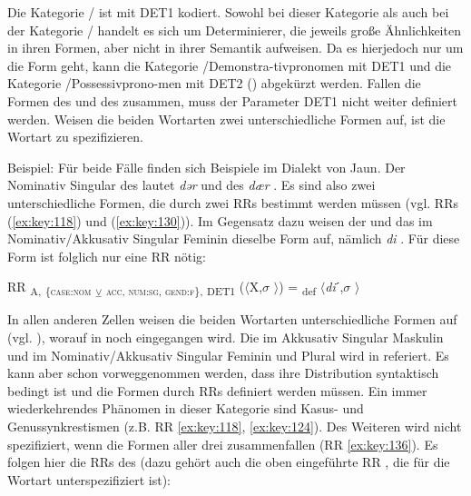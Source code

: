 Die Kategorie / ist mit DET1 kodiert. Sowohl bei dieser Kategorie als auch bei der Kategorie / handelt es sich um Determinierer, die jeweils große Ähnlichkeiten in ihren Formen, aber nicht in ihrer Semantik aufweisen. Da es hier\linebreak jedoch nur um die Form geht, kann die Kategorie \slash{}Demonstra-\linebreak tivpronomen mit DET1 und die Kategorie \slash Possessivprono-\linebreak men mit DET2 () abgekürzt werden. Fallen die Formen des  und des  zusammen, muss der Parameter DET1 nicht weiter definiert werden. Weisen die beiden Wortarten zwei unterschiedliche Formen auf, ist die Wortart zu spezifizieren.

{Beispiel}: Für beide Fälle finden sich Beispiele im Dialekt von Jaun. Der Nominativ Singular des  lautet \textit{dər} und des  \textit{dær} \citep[282]{Stucki1917}. Es sind also zwei unterschiedliche Formen, die durch zwei RRs bestimmt werden müssen (vgl. RRs (\ref{ex:key:118}) und (\ref{ex:key:130})). Im Gegensatz dazu weisen der  und das  im Nominativ/Akkusativ Singular Feminin dieselbe Form auf, nämlich \textit{di} \citep[282]{Stucki1917}. Für diese Form ist folglich nur eine RR nötig:

\ea%
\label{ex:key:117}
 RR \textsubscript{A,} \textsubscript{\{\textsc{case:nom}} \textsubscript{\tiny $\veebar$}\textsubscript{ \textsc{acc}}\textsubscript{, \textsc{num:sg}, \textsc{gend:f}\},} \textsubscript{DET1} ($\langle$X,$\sigma$ $\rangle$) = \textsubscript{def} $\langle$\textit{di}ˊ,$\sigma$ $\rangle$ \\
\z

In allen anderen Zellen weisen die beiden Wortarten unterschiedliche Formen auf (vgl. ), worauf in  noch eingegangen wird. Die  im Akkusativ Singular Maskulin und im Nominativ/Akkusativ Singular Feminin und Plural wird in  referiert. Es kann aber schon vorweggenommen werden, dass ihre Distribution syntaktisch bedingt ist und die Formen durch RRs definiert werden müssen. Ein immer wiederkehrendes Phänomen in dieser Kategorie sind Kasus- und Genussynkrestismen (z.B. RR \ref{ex:key:118}, \ref{ex:key:124}). Des Weiteren wird  nicht spezifiziert, wenn die Formen aller drei  zusammenfallen (RR \ref{ex:key:136}). Es folgen hier die RRs des  (dazu gehört auch die oben eingeführte RR , die für die Wortart unterspezifiziert ist):

